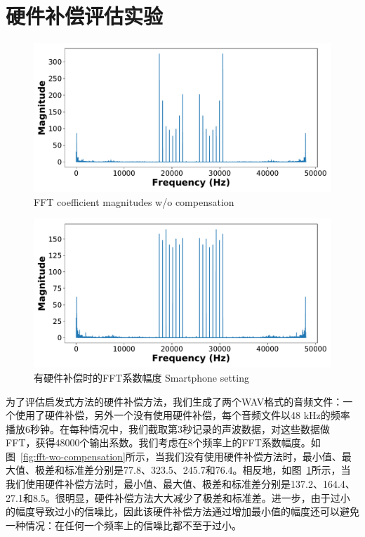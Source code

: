 \section{硬件补偿评估实验}

\begin{figure}
  \centering
  \begin{minipage}[t]{0.49\textwidth}
    \centering
    \includegraphics[width=\textwidth]{figure/nocompensation.pdf}
      {FFT coefficient magnitudes w/o compensation}
        \label{fig:fft-wo-compensation}
  \end{minipage}
  \centering
  \begin{minipage}[t]{0.49\textwidth}
    \centering
    \includegraphics[width=\textwidth]{figure/compensation.pdf}
    \bicaption
    {有硬件补偿时的FFT系数幅度}
    {Smartphone setting}
    \label{fig:fft-compensation}
   \end{minipage}
\end{figure}

为了评估启发式方法的硬件补偿方法，我们生成了两个WAV格式的音频文件：一个使用了硬件补偿，另外一个没有使用硬件补偿，每个音频文件以48 kHz的频率播放6秒钟。在每种情况中，我们截取第3秒记录的声波数据，对这些数据做FFT，获得48000个输出系数。我们考虑在8个频率上的FFT系数幅度。如图~\ref{fig:fft-wo-compensation}所示，当我们没有使用硬件补偿方法时，最小值、最大值、极差和标准差分别是77.8、323.5、245.7和76.4。相反地，如图~\ref{fig:fft-compensation}所示，当我们使用硬件补偿方法时，最小值、最大值、极差和标准差分别是137.2、164.4、27.1和8.5。很明显，硬件补偿方法大大减少了极差和标准差。进一步，由于过小的幅度导致过小的信噪比，因此该硬件补偿方法通过增加最小值的幅度还可以避免一种情况：在任何一个频率上的信噪比都不至于过小。


